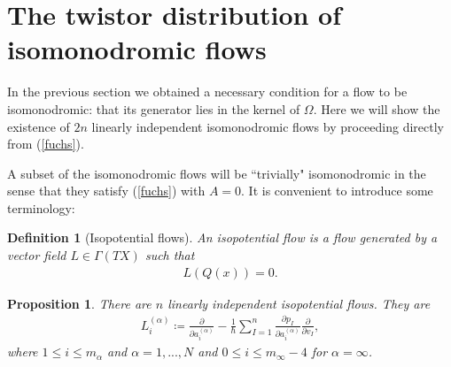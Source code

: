 \documentclass[a4paper,12pt,reqno]{amsart}
\newcounter{counter2}
\numberwithin{equation}{section}
\numberwithin{counter2}{section}
\newcounter{counter3}
\newtheorem{prop}[counter2]{Proposition}
\newtheorem{defn}[counter2]{Definition}
\begin{document}
\section{The twistor distribution of isomonodromic flows}\label{flows_calculation}
In the previous section we obtained a necessary condition for a flow to be isomonodromic: that its generator lies in the kernel of $\Omega$.  Here we will show the existence of $2n$ linearly independent isomonodromic flows by proceeding directly from (\ref{fuchs}).  \par
A subset of the isomonodromic flows will be ``trivially" isomonodromic in the sense that they satisfy (\ref{fuchs}) with $A = 0$.  It is convenient to introduce some terminology:
\begin{defn}[Isopotential flows]\label{isopotential_defn}
An isopotential flow is a flow generated by a vector field $L \in \Gamma(TX)$ such that
\begin{align}
L(Q(x)) = 0.  
\end{align}
\end{defn}  
\begin{prop}\label{isopotential_flows_prop}
There are $n$ linearly independent isopotential flows.  They are 
\begin{align}\label{isopotential_flows}
L_{i}^{(\alpha)} \coloneqq \frac{\partial}{\partial a_i^{(\alpha)}} - \frac{1}{\hbar}\sum_{I=1}^{n} \frac{\partial p_I}{\partial a_i^{(\alpha)}} \frac{\partial}{\partial v_I}, 
\end{align}
where $1 \le i \le m_\alpha$ and $\alpha = 1,...,N$ and  $0 \le i \le m_\infty - 4$ for $\alpha = \infty$.
\end{prop}
\end{document}
